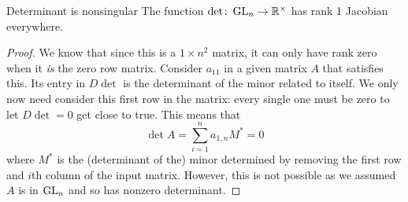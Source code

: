 \documentclass{article}
\begin{document}
\begin{proposition}{Determinant is nonsingular}{}
  The function $\det \from \GL_{n} \to \RR[\times]$ has rank 1 Jacobian everywhere.
\end{proposition}
\begin{proof}
  We know that since this is a $1 \times n^{2}$ matrix, it can only have rank zero when it \emph{is} the zero row matrix.
  Consider $a_{11}$ in a given matrix $A$ that satisfies this. Its entry in $D\det$ is the determinant of the minor related to itself.
  We only now need consider this first row in the matrix: every single one must be zero to let $D\det = 0$ get close to true.
  This means that
  \[ \det A = \sum_{i = 1}^{n}a_{1,n}M^{\ast} = 0 \]
  where $M^{\ast}$ is the (determinant of the) minor determined by removing the first row and $i$th column of the input matrix.
  However, this is not possible as we assumed $A$ is in $\GL_{n}$ and so has nonzero determinant.
\end{proof}
\end{document}
